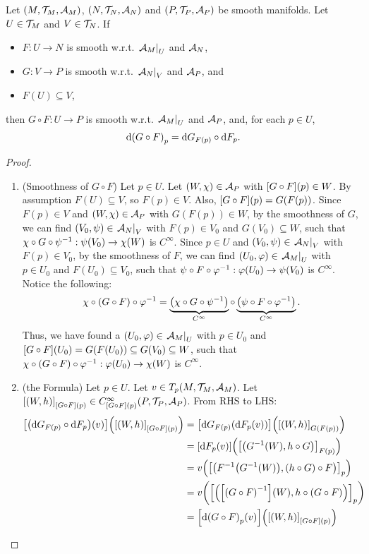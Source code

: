 \documentclass[11pt,reqno]{amsart}
\renewcommand{\phi}{\varphi}
\begin{document}
\begin{Thm}\label{thm:chain-rule}
Let $(M,\mathcal{T}_M,\mathcal{A}_M)$, $(N,\mathcal{T}_N,\mathcal{A}_N)$ and $(P,\mathcal{T}_P,\mathcal{A}_P)$ be smooth manifolds.
Let $U\in\mathcal{T}_M$ and $V\in\mathcal{T}_N$.
If
\begin{itemize}
\item $F:U\to N$ is smooth w.r.t. $\eval{\A_M}_U$ and $\mathcal{A}_N$,
\item $G:V\to P$ is smooth w.r.t. $\eval{\A_N}_V$ and $\mathcal{A}_P$, and
\item $F(U)\subseteq V$,
\end{itemize}
then $G\circ F:U\to P$ is smooth w.r.t. $\eval{\A_M}_U$ and
$\mathcal{A}_P$, and, for each $p\in U$,
\[\dd\Br{G\circ F}_p=\dd G_{F(p)}\circ\dd F_p.\]
\end{Thm}
\begin{proof}
\begin{enumerate}
\item (Smoothness of $G\circ F$)
Let $p\in U$. Let $(W,\chi)\in\mathcal{A}_P$ with $\FUNC{G\circ F}{p}\in W$.
By assumption $F(U)\subseteq V$, so $F(p)\in V$.
Also, $\FUNC{G\circ F}{p}=G(F(p))$.
Since $F(p)\in V$ and $(W,\chi)\in\mathcal{A}_P$ with $G(F(p))\in W$,
by the smoothness of $G$,
we can find $(V_0,\psi)\in\eval{\A_N}_V$ with $F(p)\in V_0$ and $G(V_0)\subseteq W$,
such that $\chi\circ G\circ\psi^{-1}:\psi(V_0)\to\chi(W)$ is $C^\infty$.
Since $p\in U$ and $(V_0,\psi)\in\eval{\A_N}_V$ with $F(p)\in V_0$, by the smoothness
of $F$, we can find $(U_0,\phi)\in\eval{\A_M}_U$ with $p\in U_0$ and
$F(U_0)\subseteq V_0$, such that
$\psi\circ F\circ\phi\inv:\phi(U_0)\to\psi(V_0)$ is $C^\infty$.
Notice the following:
\[\chi\circ(G\circ F)\circ\phi\inv
=\underbrace{\Br{\chi\circ G\circ\psi\inv}}_{C^\infty}\circ
\underbrace{\Br{\psi\circ F\circ\phi\inv}}_{C^\infty}.\]
Thus, we have found
a $(U_0,\phi)\in\eval{\A_M}_U$ with $p\in U_0$ and
$\FUNC{G\circ F}{U_0}=G(F(U_0))\subseteq G(V_0)\subseteq W$, such that
$\chi\circ(G\circ F)\circ\phi\inv:\phi(U_0)\to\chi(W)$ is $C^\infty$.
\item (the Formula)
Let $p\in U$.
Let $v\in T_p(M,\mathcal{T}_M,\mathcal{A}_M)$.
Let $\SqBr{(W,h)}_{\FUNC{G\circ F}{p}}\in
C_{\FUNC{G\circ F}{p}}^\infty(P,\T_P,\A_P)$.
From RHS to LHS:
\[\begin{aligned}
\FUNC{\Func{\dd G_{F(p)}\circ\dd F_p}{v}}{\SqBr{(W,h)}_{\FUNC{G\circ F}{p}}}
&=\FUNC{\dd G_{F(p)}\Br{\dd F_p(v)}}{\SqBr{(W,h)}_{G(F(p))}}\\
&=\FUNC{\dd F_p(v)}{\SqBr{\Br{G\inv(W),h\circ G}}_{F(p)}}\\
&=v\Br{\SqBr{\Br{F\inv\Br{G\inv(W)},(h\circ G)\circ F}}_p}\\
&=v\Br{\SqBr{\Br{\FUNC{\Br{G\circ F}\inv}{W},h\circ(G\circ F)}}_p}\\
&=\FUNC{\dd\Br{G\circ F}_p(v)}{\SqBr{(W,h)}_{\FUNC{G\circ F}{p}}}
\end{aligned}\]
\end{enumerate}
\end{proof}
\end{document}

